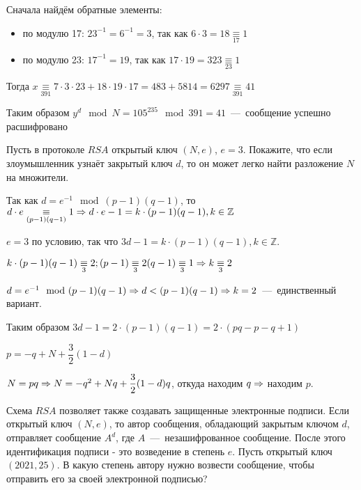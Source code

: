 \documentclass[a4paper,12pt]{article}
\begin{document}
\begin{solution}
	Сначала найдём обратные элементы:
	
	\begin{itemize}
		\item по модулю 17: $23^{-1} = 6^{-1} = 3$, так как $6 \cdot 3 = 18 \underset{17}{\equiv} 1$
		\item по модулю 23: $17^{-1} = 19$, так как $17 \cdot 19 = 323 \underset{23}{\equiv} 1$
	\end{itemize}
	
	Тогда $x  \underset{391}{\equiv} 7 \cdot 3 \cdot 23 + 18 \cdot 19 \cdot 17 = 483 + 5814 = 6297 \underset{391}{\equiv} 41$
	
	Таким образом $y^d \mod N = 105^{235} \mod 391 = 41$~---~сообщение успешно расшифровано
	
\end{solution}

\begin{task}
	Пусть в протоколе $RSA$ открытый ключ $(N, e)$, $e=3$. Покажите, что если злоумышленник узнаёт закрытый ключ $d$, то он может легко найти разложение $N$ на множители.
\end{task}

\begin{solution}
	Так как $d = e^{-1} \mod (p-1)(q-1)$, то $d \cdot e \underset{(p-1)(q-1)}{\equiv} 1 \Rightarrow d\cdot e - 1 = k \cdot (p-1)(q-1), k \in \mathbb{Z}$
	
	$e=3$ по условию, так что $3d - 1 = k \cdot (p-1)(q-1), k \in \mathbb{Z}$.
	
	$k \cdot (p-1)(q-1) \underset{3}{\equiv} 2; (p-1) \underset{3}{\equiv} 2 (q-1) \underset{3}{\equiv} 1 \Rightarrow k \underset{3}{\equiv} 2$
	
	$d = e^{-1} \mod (p-1)(q-1) \Rightarrow d < (p-1)(q-1) \Rightarrow k = 2$~---~единственный вариант.
	
	Таким образом $3d - 1 = 2 \cdot (p-1)(q-1) = 2 \cdot (pq - p - q + 1)$
	
	$p = -q + N + \dfrac{3}{2}(1-d)$
	
	$N = pq \Rightarrow N = -q^2 + Nq + \dfrac{3}{2}(1-d)q$, откуда находим $q \Rightarrow$ находим $p$.
\end{solution}

\begin{task}
	Схема $RSA$ позволяет также создавать защищенные электронные подписи. Если открытый ключ $(N, e)$, то автор сообщения, обладающий закрытым ключом $d$, отправляет сообщение $A^d$, где $A$~---~незашифрованное сообщение. После этого идентификация подписи - это возведение в степень $e$. Пусть открытый ключ $(2021, 25)$. В какую степень автору нужно возвести сообщение, чтобы отправить его за своей электронной подписью?
\end{task}
\end{document}
